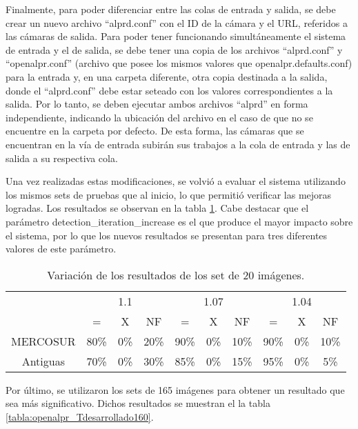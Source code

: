 \begin{enumerate}
	Finalmente, para poder diferenciar entre las colas de entrada y salida, se debe crear un nuevo archivo ``alprd.conf'' con el ID de la cámara y el URL, referidos a las cámaras de salida. Para poder tener funcionando simultáneamente el sistema de entrada y el de salida, se debe tener una copia de los archivos ``alprd.conf'' y ``openalpr.conf'' (archivo que posee los mismos valores que openalpr.defaults.conf) para la entrada y, en una carpeta diferente, otra copia destinada a la salida, donde el ``alprd.conf'' debe estar seteado con los valores correspondientes a la salida. Por lo tanto, se deben ejecutar ambos archivos ``alprd'' en forma independiente, indicando la ubicación del archivo en el caso de que no se encuentre en la carpeta por defecto. De esta forma, las cámaras que se encuentran en la vía de entrada subirán sus trabajos a la cola de entrada y las de salida a su respectiva cola.
\end{enumerate}		
		
Una vez realizadas estas modificaciones, se volvió a evaluar el sistema utilizando los mismos sets de pruebas que al inicio, lo que permitió verificar las mejoras logradas. Los resultados se observan en la tabla \ref{tabla:openalpr_Tdesarrollado}. Cabe destacar que el parámetro detection\_iteration\_increase es el que produce el mayor impacto sobre el sistema, por lo que los nuevos resultados se presentan para tres diferentes valores de este parámetro.
		
\begin{table}[htb]
	\centering
	\resizebox{14cm}{!} {
		\begin{tabular}{|c|c|c|c|c|c|c|c|c|c|}
			\hline
			& \multicolumn{3}{c|}{1.1} & \multicolumn{3}{c|}{1.07} & \multicolumn{3}{c|}{1.04}\\
			\cline{2-10}
			& = & X & NF & = & X & NF & = & X & NF\\
			\hline \hline
			MERCOSUR & 80\% & 0\% & 20\% & 90\% & 0\% & 10\% & 90\% & 0\% & 10\%\\ \hline
			Antiguas & 70\% & 0\% & 30\% & 85\% & 0\% & 15\% & 95\% & 0\% & 5\%\\ \hline
		\end{tabular}
	}
	\caption{Variación de los resultados de los set de 20 imágenes.}
	\label{tabla:openalpr_Tdesarrollado}
\end{table}
	
Por último, se utilizaron los sets de 165 imágenes para obtener un resultado que sea más significativo. Dichos resultados se muestran el la tabla \ref{tabla:openalpr_Tdesarrollado160}.
	
